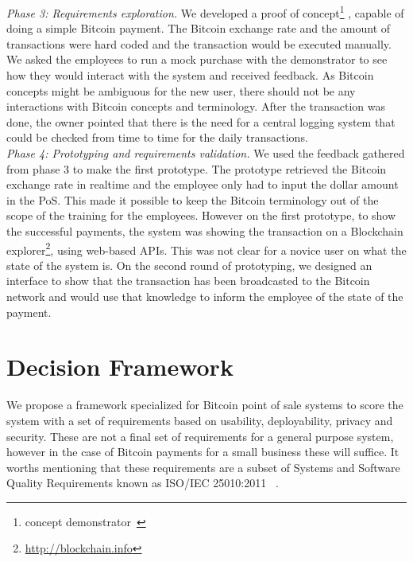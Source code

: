\textit{Phase 3: Requirements exploration.}
We developed a proof of concept\footnote{concept demonstrator~\cite{REScenario}} , capable of doing a simple Bitcoin payment. The Bitcoin exchange rate and the amount of transactions were hard coded and the transaction would be executed manually. We asked the employees to run a mock purchase with the demonstrator to see how they would interact with the system and received feedback. As Bitcoin concepts might be ambiguous for the new user, there should not be any interactions with Bitcoin concepts and terminology. After the transaction was done, the owner pointed that there is the need for a central logging system that could be checked from time to time for the daily transactions.\\


\textit{Phase 4: Prototyping and requirements validation.}
We used the feedback gathered from phase 3 to make the first prototype. The prototype retrieved the Bitcoin exchange rate in realtime and the employee only had to input the dollar amount in the PoS. This made it possible to keep the Bitcoin terminology out of the scope of the training for the employees. However on the first prototype, to show the successful payments, the system was showing the transaction on a Blockchain explorer\footnote{\url{http://blockchain.info}}, using web-based APIs. This was not clear for a novice user on what the state of the system is. On the second round of prototyping, we designed an interface to show that the transaction has been broadcasted to the Bitcoin network and would use that knowledge to inform the employee of the state of the payment.\\

\section{Decision Framework}
We propose a framework specialized for Bitcoin point of sale systems to score the system with a set of requirements based on usability, deployability, privacy and security. These are not a final set of requirements for a general purpose system, however in the case of Bitcoin payments for a small business these will suffice. It worths mentioning that these requirements are a subset of Systems and Software Quality Requirements known as ISO/IEC 25010:2011 ~\cite{iso25010}. \\


